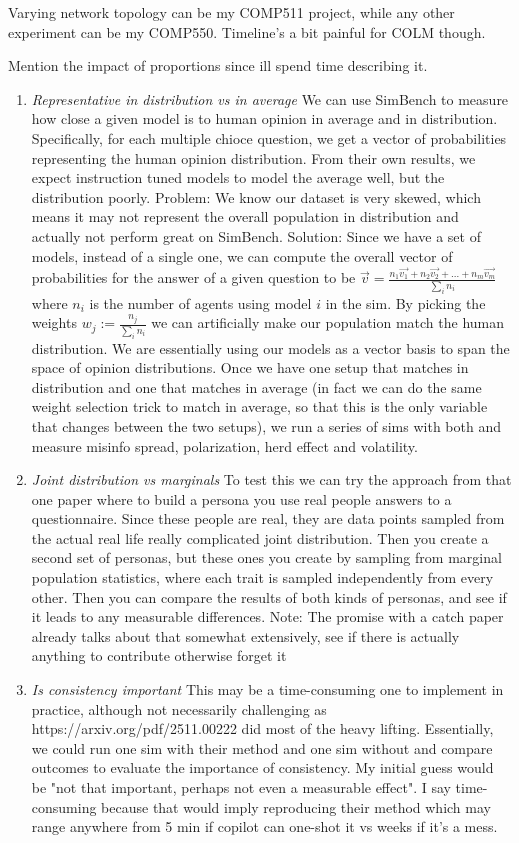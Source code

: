 \documentclass{article} %
\begin{document}
Varying network topology can be my COMP511 project, while any other experiment can be my COMP550. Timeline's a bit painful for COLM though.

Mention the impact of proportions since ill spend time describing it.

\begin{enumerate}
    \item \textit{Representative in distribution vs in average} We can use SimBench to measure how close a given model is to human opinion in average and in distribution. Specifically, for each multiple chioce question, we get a vector of probabilities representing the human opinion distribution. From their own results, we expect instruction tuned models to model the average well, but the distribution poorly. Problem: We know our dataset is very skewed, which means it may not represent the overall population in distribution and actually not perform great on SimBench. Solution: Since we have a set of models, instead of a single one, we can compute the overall vector of probabilities for the answer of a given question to be $\vec{v}=\frac{n_1\vec{v_1}+n_2\vec{v_2}+...+n_m\vec{v_m}}{\sum_i{n_i}}$ where $n_i$ is the number of agents using model $i$ in the sim. By picking the weights $w_j:=\frac{n_j}{\sum_i{n_i}}$ we can artificially make our population match the human distribution. We are essentially using our models as a vector basis to span the space of opinion distributions. Once we have one setup that matches in distribution and one that matches in average (in fact we can do the same weight selection trick to match in average, so that this is the only variable that changes between the two setups), we run a series of sims with both and measure misinfo spread, polarization, herd effect and volatility.
    \item \textit{Joint distribution vs marginals} To test this we can try the approach from that one paper where to build a persona you use real people answers to a questionnaire. Since these people are real, they are data points sampled from the actual real life really complicated joint distribution. Then you create a second set of personas, but these ones you create by sampling from marginal population statistics, where each trait is sampled independently from every other. Then you can compare the results of both kinds of personas, and see if it leads to any measurable differences. Note: The promise with a catch paper already talks about that somewhat extensively, see if there is actually anything to contribute otherwise forget it
    \item \textit{Is consistency important} This may be a time-consuming one to implement in practice, although not necessarily challenging as https://arxiv.org/pdf/2511.00222 did most of the heavy lifting. Essentially, we could run one sim with their method and one sim without and compare outcomes to evaluate the importance of consistency. My initial guess would be "not that important, perhaps not even a measurable effect". I say time-consuming because that would imply reproducing their method which may range anywhere from 5 min if copilot can one-shot it vs weeks if it's a mess.

\end{enumerate}
\end{document}
